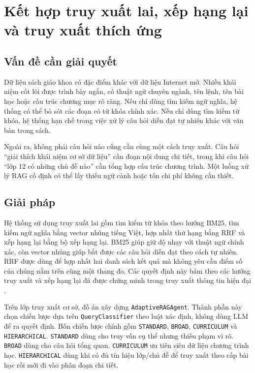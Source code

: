 \documentclass[../DoAn.tex]{subfiles}
\begin{document}
\section{Kết hợp truy xuất lai, xếp hạng lại và truy xuất thích ứng}

\subsection{Vấn đề cần giải quyết}

Dữ liệu sách giáo khoa có đặc điểm khác với dữ liệu Internet mở. Nhiều khái niệm cốt lõi được trình bày ngắn, có thuật ngữ chuyên ngành, tên lệnh, tên bài học hoặc cấu trúc chương mục rõ ràng. Nếu chỉ dùng tìm kiếm ngữ nghĩa, hệ thống có thể bỏ sót các đoạn có từ khóa chính xác. Nếu chỉ dùng tìm kiếm từ khóa, hệ thống hạn chế trong việc xử lý câu hỏi diễn đạt tự nhiên khác với văn bản trong sách.

Ngoài ra, không phải câu hỏi nào cũng cần cùng một cách truy xuất. Câu hỏi ``giải thích khái niệm cơ sở dữ liệu'' cần đoạn nội dung chi tiết, trong khi câu hỏi ``lớp 12 có những chủ đề nào'' cần tổng hợp cấu trúc chương trình. Một luồng xử lý RAG cố định có thể lấy thiếu ngữ cảnh hoặc tốn chi phí không cần thiết.

\subsection{Giải pháp}

Hệ thống sử dụng truy xuất lai gồm tìm kiếm từ khóa theo hướng BM25, tìm kiếm ngữ nghĩa bằng vector nhúng tiếng Việt, hợp nhất thứ hạng bằng RRF và xếp hạng lại bằng bộ xếp hạng lại. BM25 giúp giữ độ nhạy với thuật ngữ chính xác, còn vector nhúng giúp bắt được các câu hỏi diễn đạt theo cách tự nhiên. RRF được dùng để hợp nhất hai danh sách kết quả mà không yêu cầu điểm số của chúng nằm trên cùng một thang đo. Các quyết định này bám theo các hướng truy xuất và xếp hạng lại đã được chứng minh trong truy xuất thông tin hiện đại \cite{robertson2009bm25,reimers2019sbert,cormack2009rrf,nogueira2019passage}.

Trên lớp truy xuất cơ sở, đồ án xây dựng \texttt{AdaptiveRAGAgent}. Thành phần này chọn chiến lược dựa trên \texttt{QueryClassifier} theo luật xác định, không dùng LLM để ra quyết định. Bốn chiến lược chính gồm \texttt{STANDARD}, \texttt{BROAD}, \texttt{CURRICULUM} và \texttt{HIERARCHICAL}. \texttt{STANDARD} dùng cho truy vấn cụ thể nhưng thiếu phạm vi rõ. \texttt{BROAD} dùng cho câu hỏi tổng quan. \texttt{CURRICULUM} ưu tiên siêu dữ liệu chương trình học. \texttt{HIERARCHICAL} dùng khi có đủ tín hiệu lớp/chủ đề để truy xuất theo cấp bài học rồi mới đi vào phân đoạn chi tiết.
\end{document}
